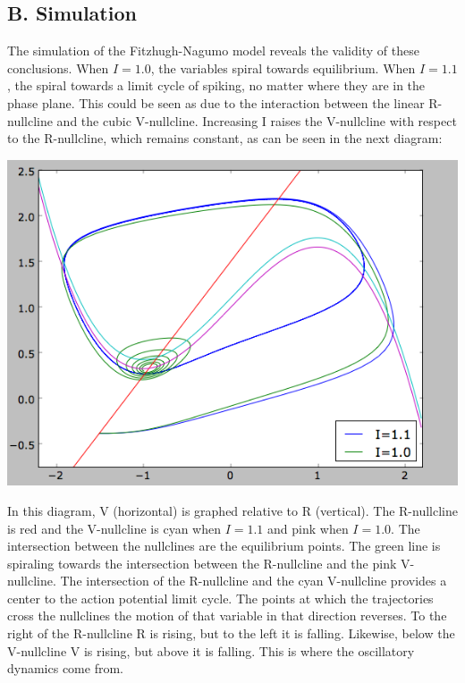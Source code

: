 \documentclass[12pt]{article}
\begin{document}
\subsection{B. Simulation}

The simulation of the Fitzhugh-Nagumo model reveals the validity of these conclusions.  When $I=1.0$, the variables spiral towards equilibrium.  When $I=1.1$, the spiral towards a limit cycle of spiking, no matter where they are in the phase plane.  This could be seen as due to the interaction between the linear R-nullcline and the cubic V-nullcline.  Increasing I raises the V-nullcline with respect to the R-nullcline, which remains constant, as can be seen in the next diagram:

\vspace{15pt}
\includegraphics[scale=0.71]{phaseplane.png}
\vspace{5pt}

In this diagram, V (horizontal) is graphed relative to R (vertical).  The R-nullcline is red and the V-nullcline is cyan when $I=1.1$ and pink when $I=1.0$.  The intersection between the nullclines are the equilibrium points.  The green line is spiraling towards the intersection between the R-nullcline and the pink V-nullcline.  The intersection of the R-nullcline and the cyan V-nullcline provides a center to the action potential limit cycle.  The points at which the trajectories cross the nullclines the motion of that variable in that direction reverses.  To the right of the R-nullcline R is rising, but to the left it is falling.  Likewise, below the V-nullcline V is rising, but above it is falling.  This is where the oscillatory dynamics come from.  
\end{document}
